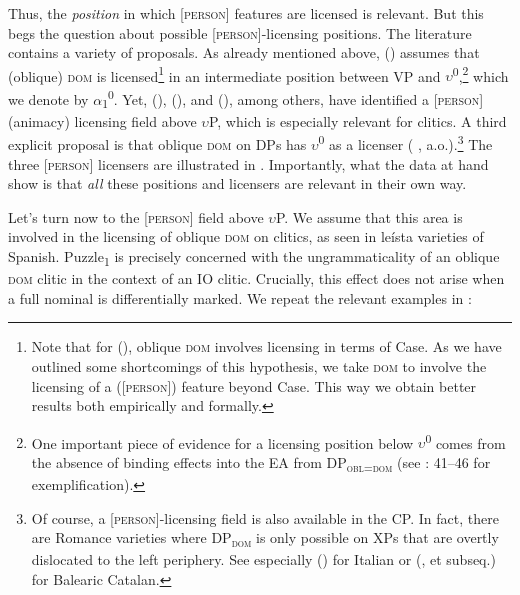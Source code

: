 \documentclass[output=paper,colorlinks,citecolor=brown,draft,draftmode]{langscibook}
\begin{document}
Thus, the \textit{position} in which [\textsc{person}] features are licensed is relevant. But this begs the question about possible [\textsc{person}]-licensing positions. The literature contains a variety of proposals. As already mentioned above, \citeauthor{lopez12} (\citeyear{lopez12}) assumes that (oblique) \textsc{dom} is licensed\footnote{Note that for \citeauthor{lopez12} (\citeyear{lopez12}), oblique \textsc{dom} involves licensing in terms of Case. As we have outlined some shortcomings of this hypothesis, we take \textsc{dom} to involve the licensing of a ([\textsc{person}]) feature beyond Case. This way we obtain better results both empirically and formally.
} in an intermediate position between VP and $\upsilon$\textsuperscript{0},\footnote{One important piece of evidence for a licensing position below $\upsilon$\textsuperscript{0} comes from the absence of binding effects into the EA from DP\textsubscript{\textsc{obl=dom}} (see \citeauthor{lopez12} \citeyear{lopez12}: 41--46 for exemplification).}\label{ex:irimia:footnoteLopezpositions} which we denote by $\alpha$\textsubscript{1}\textsuperscript{0}. Yet, \citeauthor{belletti2005} (\citeyear{belletti2005}), \citeauthor{ciucivara2009} (\citeyear{ciucivara2009}), and \citeauthor{stegovec2020} (\citeyear{stegovec2020}), among others, have identified a [\textsc{person}] (animacy) licensing field above $\upsilon$P, which is especially relevant for clitics. A third explicit proposal is that oblique \textsc{dom} on DPs has $\upsilon$\textsuperscript{0} as a licenser (\citeauthor{rodmondon07} \citeyear{rodmondon07}, a.o.).\footnote{Of course, a [\textsc{person}]-licensing field is also available in the CP. In fact, there are Romance varieties where DP\textsubscript{\textsc{dom}} is only possible on XPs that are overtly dislocated to the left periphery. See especially \citeauthor{belletti18} (\citeyear{belletti18}) for Italian or \citeauthor{EscandellVidal2009} (\citeyear{EscandellVidal2009}, et subseq.) for Balearic Catalan.} The three [\textsc{person}] licensers are illustrated in . Importantly, what the data at hand show is that \textit{all} these positions and licensers are relevant in their own way.

Let's turn now to the [\textsc{person}] field above $\upsilon$P. We assume that this area is involved in the licensing of oblique \textsc{dom} on clitics, as seen in leísta varieties of Spanish. {Puzzle}\textsubscript{1} is precisely concerned with the ungrammaticality of an oblique \textsc{dom} clitic in the context of an IO clitic. Crucially, this effect does not arise when a full nominal is differentially marked. We repeat the relevant examples in :
\end{document}
